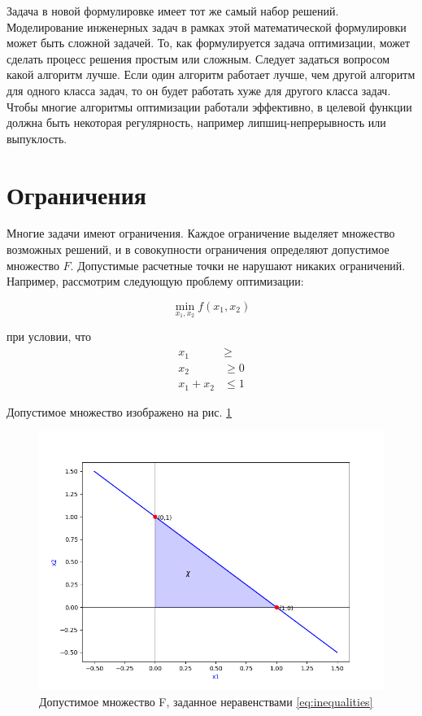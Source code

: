 Задача в новой формулировке имеет тот же самый набор решений. Моделирование инженерных задач в рамках этой математической формулировки может быть сложной задачей. То, как формулируется задача оптимизации, может сделать процесс решения простым или сложным. Следует задаться вопросом какой алгоритм лучше. Если один алгоритм работает лучше, чем другой алгоритм для одного класса задач, то он будет работать хуже для другого класса задач. Чтобы многие алгоритмы оптимизации работали эффективно, в целевой функции должна быть некоторая регулярность, например липшиц-непрерывность или выпуклость. 

\section{Ограничения}

Многие задачи имеют ограничения. Каждое ограничение выделяет множество возможных решений, и в совокупности ограничения определяют допустимое множество  $F$. Допустимые расчетные точки не нарушают никаких ограничений. Например, рассмотрим следующую проблему оптимизации:

\begin{equation}
\min_{x_1, x_2} f(x_1, x_2)
\label{eq:taskOptimizationX1X2}
\end{equation}


 \begin{center}
 при условии, что 
\begin{equation}
  \begin{aligned}
    x_1 &\geq  \\
    x_2 &\geq 0  \\
    x_1 + x_2 &\leq 1
  \end{aligned}
  \label{eq:inequalities}
\end{equation}
\end{center}

Допустимое множество изображено на рис. \ref{fig:figure_2}

\begin{figure}[ht]
 \centering
		\includegraphics[height = 7 cm, keepaspectratio]{../assets/images/Figure_2.png}
		\caption{Допустимое множество F, заданное неравенствами \eqref{eq:inequalities}}
		\label{fig:figure_2}
	\end{figure}
    
